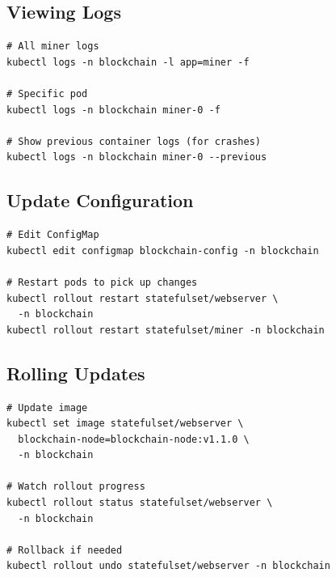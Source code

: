 \subsection{Viewing Logs}

\begin{listing}[H]
\caption{Stream Container Logs}
\label{lst:ch23-logs}
\begin{verbatim}
# All miner logs
kubectl logs -n blockchain -l app=miner -f

# Specific pod
kubectl logs -n blockchain miner-0 -f

# Show previous container logs (for crashes)
kubectl logs -n blockchain miner-0 --previous
\end{verbatim}
\end{listing}

\subsection{Update Configuration}

\begin{listing}[H]
\caption{Update and Rollout Configuration}
\label{lst:ch23-update-config}
\begin{verbatim}
# Edit ConfigMap
kubectl edit configmap blockchain-config -n blockchain

# Restart pods to pick up changes
kubectl rollout restart statefulset/webserver \
  -n blockchain
kubectl rollout restart statefulset/miner -n blockchain
\end{verbatim}
\end{listing}

\subsection{Rolling Updates}

\begin{listing}[H]
\caption{Rolling Update Strategy}
\label{lst:ch23-rolling-update}
\begin{verbatim}
# Update image
kubectl set image statefulset/webserver \
  blockchain-node=blockchain-node:v1.1.0 \
  -n blockchain

# Watch rollout progress
kubectl rollout status statefulset/webserver \
  -n blockchain

# Rollback if needed
kubectl rollout undo statefulset/webserver -n blockchain
\end{verbatim}
\end{listing}

